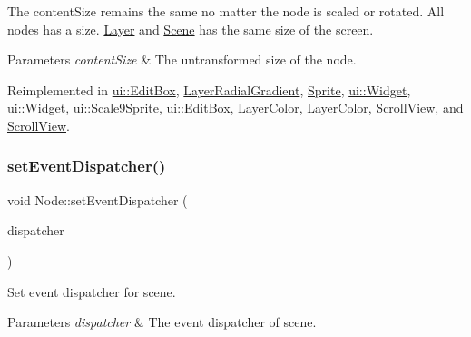 The content\+Size remains the same no matter the node is scaled or rotated. All nodes has a size. \hyperlink{classLayer}{Layer} and \hyperlink{classScene}{Scene} has the same size of the screen.


\begin{DoxyParams}{Parameters}
{\em content\+Size} & The untransformed size of the node. \\
\hline
\end{DoxyParams}


Reimplemented in \hyperlink{classui_1_1EditBox_a3fbf590dff29ba873d9c72af308f7edd}{ui\+::\+Edit\+Box}, \hyperlink{classLayerRadialGradient_ad8edf7d6ace4a1cf07966fd63c942c4b}{Layer\+Radial\+Gradient}, \hyperlink{classSprite_a040ac797e7c5a3a7ffee7acee8904629}{Sprite}, \hyperlink{classui_1_1Widget_af5f35184ff3de275929e937f81a4ae30}{ui\+::\+Widget}, \hyperlink{classui_1_1Widget_af5f35184ff3de275929e937f81a4ae30}{ui\+::\+Widget}, \hyperlink{classui_1_1Scale9Sprite_af7a55ebc4ba4b0da9ce2ce34bb3bda37}{ui\+::\+Scale9\+Sprite}, \hyperlink{classui_1_1EditBox_a1aadf938d146d0469da42e42d33e2a1e}{ui\+::\+Edit\+Box}, \hyperlink{classLayerColor_a3db3f4ffab871cc95a3dca8476c22251}{Layer\+Color}, \hyperlink{classLayerColor_a066da112c29c206c4638f84b5d3a9f37}{Layer\+Color}, \hyperlink{classScrollView_a9d52bf1ed3831200285167c35fafa686}{Scroll\+View}, and \hyperlink{classScrollView_a3cf1d7fd072898e64498a7dc9c5932c1}{Scroll\+View}.

\mbox{\label{classNode_add71c94aeabd15707311742797d21bb3}} 
\subsubsection{\texorpdfstring{set\+Event\+Dispatcher()}{setEventDispatcher()}\hspace{0.1cm}{\footnotesize\ttfamily [1/2]}}
{\footnotesize\ttfamily void Node\+::set\+Event\+Dispatcher (\begin{DoxyParamCaption}\item[{\hyperlink{classEventDispatcher}{Event\+Dispatcher} $\ast$}]{dispatcher }\end{DoxyParamCaption})\hspace{0.3cm}{\ttfamily [virtual]}}

Set event dispatcher for scene.


\begin{DoxyParams}{Parameters}
{\em dispatcher} & The event dispatcher of scene. \\
\hline
\end{DoxyParams}
\mbox{\label{classNode_a07c33fba3541a982e253f9d6c908daaa}} 
